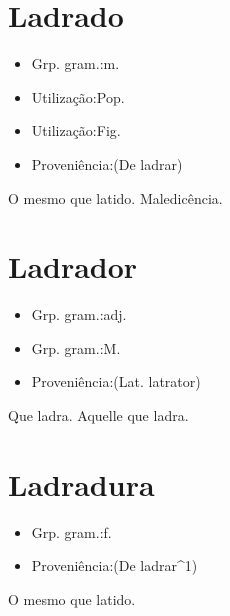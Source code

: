 \section{Ladrado}
\begin{itemize}
\item {Grp. gram.:m.}
\end{itemize}
\begin{itemize}
\item {Utilização:Pop.}
\end{itemize}
\begin{itemize}
\item {Utilização:Fig.}
\end{itemize}
\begin{itemize}
\item {Proveniência:(De \textunderscore ladrar\textunderscore )}
\end{itemize}
O mesmo que \textunderscore latido\textunderscore .
Maledicência.
\section{Ladrador}
\begin{itemize}
\item {Grp. gram.:adj.}
\end{itemize}
\begin{itemize}
\item {Grp. gram.:M.}
\end{itemize}
\begin{itemize}
\item {Proveniência:(Lat. \textunderscore latrator\textunderscore )}
\end{itemize}
Que ladra.
Aquelle que ladra.
\section{Ladradura}
\begin{itemize}
\item {Grp. gram.:f.}
\end{itemize}
\begin{itemize}
\item {Proveniência:(De \textunderscore ladrar\textunderscore ^1)}
\end{itemize}
O mesmo que \textunderscore latido\textunderscore .
